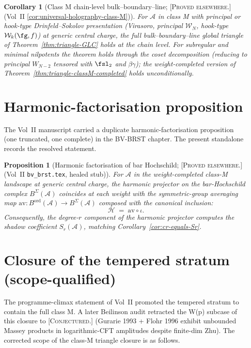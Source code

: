 \documentclass[11pt]{amsart}
\newtheorem{proposition}[theorem]{Proposition}
\newtheorem{corollary}[theorem]{Corollary}
\theoremstyle{definition}
\theoremstyle{remark}
\providecommand{\cA}{\mathcal{A}}
\providecommand{\cW}{\mathcal{W}}
\providecommand{\ClaimStatusProvedElsewhere}{\textsc{[Proved elsewhere.]}}
\providecommand{\ClaimStatusConjectured}{\textsc{[Conjectured.]}}
\begin{document}
\begin{corollary}[Class M chain-level bulk--boundary--line;
\ClaimStatusProvedElsewhere (Vol~II
\ref*{cor:universal-holography-class-M})]%
\label{cor:class-M-chain-level-triangle}%
For $\cA$ in class M with principal or hook-type Drinfeld--Sokolov
presentation (Virasoro, principal $\cW_N$, hook-type
$\cW_k(\fg, f)$) at generic central charge, the full
bulk--boundary--line global triangle of
Theorem~\ref{thm:triangle-GLC} holds at the chain level. For
subregular and minimal nilpotents the theorem holds through the
coset decomposition (reducing to principal $W_{N-2}$ tensored with
$\fsl_2$ and $\beta\gamma$); the weight-completed version of
Theorem~\ref{thm:triangle-classM-completed} holds unconditionally.
\end{corollary}

\section{Harmonic-factorisation proposition}
\label{sec:harmonic-factorization}

The Vol~II manuscript carried a duplicate harmonic-factorisation
proposition (one truncated, one complete) in the BV-BRST chapter.
The present standalone records the resolved statement.

\begin{proposition}[Harmonic factorisation of bar Hochschild;
\ClaimStatusProvedElsewhere (Vol~II \texttt{bv\_brst.tex}, healed
stub)]%
\label{prop:harmonic-factorization}%
For $\cA$ in the weight-completed class-M landscape at generic
central charge, the harmonic projector on the bar-Hochschild
complex $B^\Sigma(\cA)$ coincides at each weight with the
symmetric-group averaging map $\mathrm{av}\colon B^{\mathrm{ord}}(\cA)
\to B^\Sigma(\cA)$ composed with the canonical inclusion:
\[
  \mathcal{H} \;=\; \mathrm{av} \circ \iota.
\]
Consequently, the degree-$r$ component of the harmonic projector
computes the shadow coefficient $S_r(\cA)$, matching
Corollary~\ref{cor:cr-equals-Sr}.
\end{proposition}

\section{Closure of the tempered stratum (scope-qualified)}
\label{sec:tempered-stratum-scope}

The programme-climax statement of Vol~II promoted the tempered
stratum to contain the full class M. A later Beilinson audit
retracted the W(p) subcase of this closure to
\ClaimStatusConjectured{} (Gurarie 1993 + Flohr 1996 exhibit
unbounded Massey products in logarithmic-CFT amplitudes despite
finite-dim Zhu). The corrected scope of the class-M triangle
closure is as follows.
\end{document}
